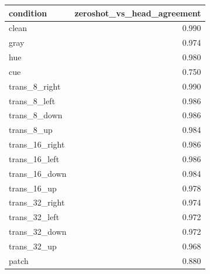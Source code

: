 \begin{tabular}{lr}
\toprule
condition & zeroshot_vs_head_agreement \\
\midrule
clean & 0.990 \\
gray & 0.974 \\
hue & 0.980 \\
cue & 0.750 \\
trans_8_right & 0.990 \\
trans_8_left & 0.986 \\
trans_8_down & 0.986 \\
trans_8_up & 0.984 \\
trans_16_right & 0.986 \\
trans_16_left & 0.986 \\
trans_16_down & 0.984 \\
trans_16_up & 0.978 \\
trans_32_right & 0.974 \\
trans_32_left & 0.972 \\
trans_32_down & 0.972 \\
trans_32_up & 0.968 \\
patch & 0.880 \\
\bottomrule
\end{tabular}
